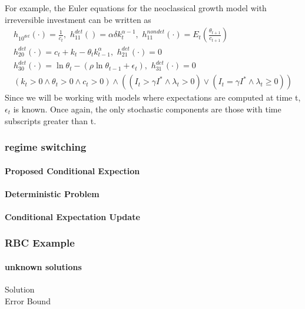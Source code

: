 \documentclass[12pt]{article}
\begin{document}
For example, the Euler equations for the  neoclassical growth  model with
irreversible investment
\label{sec:simple-rbc-model-ext} can be written as
\begin{gather}
h_{10^{det}}(\cdot)=\frac{1}{c_t},\,\,
h_{11}^{det}()=\alpha \delta k_{t}^{\alpha-1} ,\,\,
h_{11}^{nondet}(\cdot)=E_t \left (\frac{\theta_{t+1}}{c_{t+1}} \right )\\
h_{20}^{det}(\cdot)=c_t + k_t-\theta_tk_{t-1}^\alpha,\,\,
h_{21}^{det}(\cdot)=0\\
h_{30}^{det}(\cdot)=\ln \theta_t -(\rho \ln \theta_{t-1} + \epsilon_t),\,\,
h_{31}^{det}(\cdot)=0\\
(k_t>0\land\theta_t>0\land c_t>0) \land
( (I_t>\gamma I^\ast \land \lambda_t>0)\lor (I_t=\gamma I^\ast \land \lambda_t\ge0))
\end{gather}
Since we will be working with models where expectations are computed at time t, $\epsilon_t$ is known.  Once again, the only stochastic components are those with time subscripts greater than t.

\subsubsection{regime switching}
\label{sec:regime}

\paragraph{Proposed Conditional Expection}

\paragraph{Deterministic Problem}

\paragraph{Conditional Expectation Update}


\subsubsection{RBC Example}
\label{sec:generalRBCExample}

\paragraph{unknown solutions}
\begin{description}
\item[Solution]
\item[Error Bound]
\end{description}
\end{document}
